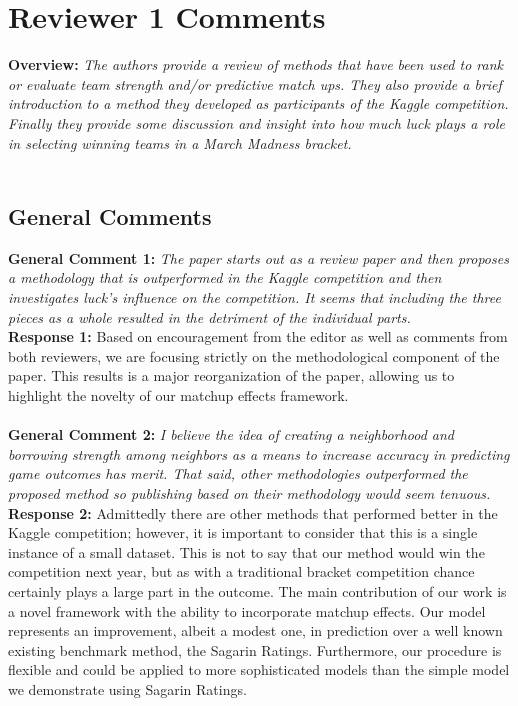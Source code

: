 \documentclass[11pt]{article} %
\begin{document}
\section*{Reviewer 1 Comments}
{\bf Overview:} \emph{The authors provide a review of methods that have been used to rank or evaluate team strength and/or predictive match ups. They also provide a brief introduction to a method they developed as participants of the Kaggle competition. Finally they provide some discussion and insight into how much luck plays a role in selecting winning teams in a March Madness bracket.}\\
\\
\subsection*{General Comments}
{\bf General Comment 1:} \emph{The paper starts out as a review paper and then proposes a methodology that is outperformed in the Kaggle competition and then investigates luck's influence on the competition. It seems that including the three pieces as a whole resulted in the detriment of the individual parts.}\\
{\bf Response 1:} Based on encouragement from the editor as well as comments from both reviewers, we are focusing strictly on the methodological component of the paper. This results is a major reorganization of the paper, allowing us to highlight the novelty of our matchup effects framework.\\
\\
{\bf General Comment 2:} \emph{I believe the idea of creating a neighborhood and borrowing strength among neighbors as a means to increase accuracy in predicting game outcomes has merit. That said, other methodologies outperformed the proposed method so publishing based on their methodology would seem tenuous.}\\
{\bf Response 2:} Admittedly there are other methods that performed better in the Kaggle competition; however, it is important to consider that this is a single instance of a small dataset. This is not to say that our method would win the competition next year, but as with a traditional bracket competition chance certainly plays a large part in the outcome. The main contribution of our work is a novel framework with the ability to incorporate matchup effects. Our model represents an improvement, albeit a modest one, in prediction over a well known existing benchmark method, the Sagarin Ratings. Furthermore, our procedure is flexible and could be applied to more sophisticated models than the simple model we demonstrate using Sagarin Ratings.  \\
\end{document}
